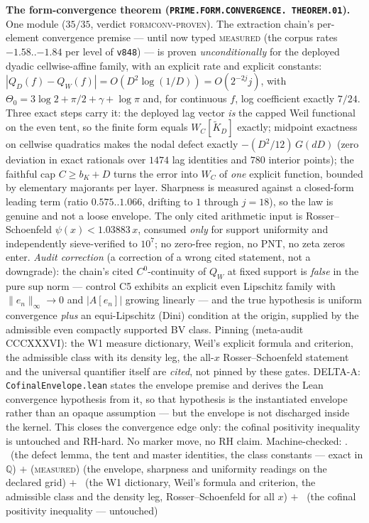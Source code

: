 \par\smallskip\noindent\textbf{The form-convergence theorem
(\texttt{PRIME.FORM.\allowbreak CONVERGENCE.\allowbreak
THEOREM.01}).}
One module ($35/35$, verdict \textsc{formconv-proven}).  The
extraction chain's per-element convergence premise --- until now
typed \textsc{measured} (the corpus rates $-1.58$..$-1.84$ per
level of \texttt{v848}) --- is proven \emph{unconditionally} for
the deployed dyadic cellwise-affine family, with an explicit
rate and explicit constants:
$|Q_D(f) - Q_W(f)| = O(D^2 \log(1/D)) = O(2^{-2j} j)$, with
$\Theta_0 = 3\log 2 + \pi/2 + \gamma + \log \pi$ and, for
continuous $f$, log coefficient exactly $7/24$.  Three exact
steps carry it: the deployed lag vector \emph{is} the capped
Weil functional on the even tent, so the finite form equals
$W_C[\widetilde{K}_D]$ exactly; midpoint exactness on cellwise
quadratics makes the nodal defect exactly $-(D^2/12)\,G(dD)$
(zero deviation in exact rationals over $1474$ lag identities
and $780$ interior points); the faithful cap $C \ge b_K + D$
turns the error into $W_C$ of \emph{one} explicit function,
bounded by elementary majorants per layer.  Sharpness is
measured against a closed-form leading term (ratio
$0.575$..$1.066$, drifting to $1$ through $j = 18$), so the law
is genuine and not a loose envelope.  The only cited arithmetic
input is Rosser--Schoenfeld $\psi(x) < 1.03883\,x$, consumed
\emph{only} for support uniformity and independently
sieve-verified to $10^7$; no zero-free region, no PNT, no zeta
zeros enter.  \emph{Audit correction} (a correction of a wrong
cited statement, not a downgrade): the chain's cited
$C^0$-continuity of $Q_W$ at fixed support is \emph{false} in
the pure sup norm --- control C5 exhibits an explicit even
Lipschitz family with $\|e_n\|_\infty \to 0$ and $|A[e_n]|$
growing linearly --- and the true hypothesis is uniform
convergence \emph{plus} an equi-Lipschitz (Dini) condition at
the origin, supplied by the admissible even compactly supported
BV class.  Pinning (meta-audit CCCXXXVI): the W1 measure
dictionary, Weil's explicit formula and criterion, the
admissible class with its density leg, the all-$x$
Rosser--Schoenfeld statement and the universal quantifier
itself are \emph{cited}, not pinned by these gates.  DELTA-A:
\texttt{CofinalEnvelope.lean} states the envelope premise and
derives the Lean convergence hypothesis from it, so that
hypothesis is the instantiated envelope rather than an opaque
assumption --- but the envelope is not discharged inside the
kernel.  This closes the convergence edge only: the cofinal
positivity inequality is untouched and RH-hard.  No marker
move, no RH claim.
Machine-checked: .
\mE\ (the defect lemma, the tent and master identities, the
class constants --- exact in $\mathbb{Q}$) $+$
(\textsc{measured}) (the envelope, sharpness and uniformity
readings on the declared grid) $+$ \mC\ (the W1 dictionary,
Weil's formula and criterion, the admissible class and the
density leg, Rosser--Schoenfeld for all $x$) $+$ \mO\ (the
cofinal positivity inequality --- untouched)
\par\smallskip


